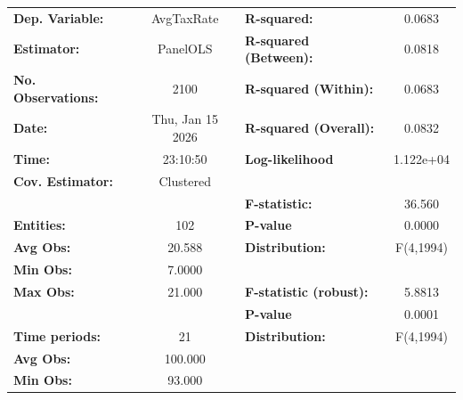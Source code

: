 \begin{center}
\begin{tabular}{lclc}
\toprule
\textbf{Dep. Variable:}                           &     AvgTaxRate     & \textbf{  R-squared:         }   &      0.0683      \\
\textbf{Estimator:}                               &      PanelOLS      & \textbf{  R-squared (Between):}  &      0.0818      \\
\textbf{No. Observations:}                        &        2100        & \textbf{  R-squared (Within):}   &      0.0683      \\
\textbf{Date:}                                    &  Thu, Jan 15 2026  & \textbf{  R-squared (Overall):}  &      0.0832      \\
\textbf{Time:}                                    &      23:10:50      & \textbf{  Log-likelihood     }   &    1.122e+04     \\
\textbf{Cov. Estimator:}                          &     Clustered      & \textbf{                     }   &                  \\
\textbf{}                                         &                    & \textbf{  F-statistic:       }   &      36.560      \\
\textbf{Entities:}                                &        102         & \textbf{  P-value            }   &      0.0000      \\
\textbf{Avg Obs:}                                 &       20.588       & \textbf{  Distribution:      }   &    F(4,1994)     \\
\textbf{Min Obs:}                                 &       7.0000       & \textbf{                     }   &                  \\
\textbf{Max Obs:}                                 &       21.000       & \textbf{  F-statistic (robust):} &      5.8813      \\
\textbf{}                                         &                    & \textbf{  P-value            }   &      0.0001      \\
\textbf{Time periods:}                            &         21         & \textbf{  Distribution:      }   &    F(4,1994)     \\
\textbf{Avg Obs:}                                 &      100.000       & \textbf{                     }   &                  \\
\textbf{Min Obs:}                                 &       93.000       & \textbf{                     }   &                  \\

\end{tabular}
\end{center}
